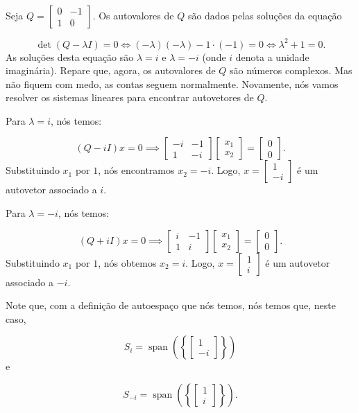 \begin{Example}
	Seja $Q = \begin{bmatrix}
		0 & -1 \\
		1 & 0
	\end{bmatrix}$. Os autovalores de $Q$ são dados pelas soluções da equação
	
	$$
	\det(Q - \lambda I) = 0 \iff (-\lambda)(-\lambda) - 1\cdot(-1) = 0 \iff \lambda^2 + 1 = 0.
	$$
	As soluções desta equação são $\lambda = i$ e $\lambda = -i$ (onde $i$ denota a unidade imaginária). Repare que, agora, os autovalores de $Q$ são números complexos. Mas não fiquem com medo, as contas seguem normalmente. Novamente, nós vamos resolver os sistemas lineares para encontrar autovetores de $Q$.
	
	Para $\lambda = i$, nós temos:
	
	$$
	(Q - iI)x = 0 \implies \begin{bmatrix}
		-i & -1 \\
		1 & -i
	\end{bmatrix}\begin{bmatrix}
		x_1 \\
		x_2
	\end{bmatrix} = \begin{bmatrix}
		0 \\
		0
	\end{bmatrix}.
	$$
	Substituindo $x_1$ por $1$, nós encontramos $x_2 = -i$. Logo, $x = \begin{bmatrix}
		1 \\
		-i
	\end{bmatrix}$ é um autovetor associado a $i$.
	
	Para $\lambda = -i$, nós temos:
	
	$$
	(Q + iI)x = 0 \implies \begin{bmatrix}
		i & -1 \\
		1 & i
	\end{bmatrix}\begin{bmatrix}
		x_1 \\
		x_2
	\end{bmatrix} = \begin{bmatrix}
		0 \\
		0
	\end{bmatrix}.
	$$
	Substituindo $x_1$ por $1$, nós obtemos $x_2 = i$. Logo, $x = \begin{bmatrix}
		1 \\
		i
	\end{bmatrix}$ é um autovetor associado a $-i$.
	
	Note que, com a definição de autoespaço que nós temos, nós temos que, neste caso, 
	
	$$
	S_i = \operatorname{span}\left(\left\{\begin{bmatrix}
		1 \\
		-i
	\end{bmatrix}\right\}\right)
	$$
	e
	
	$$
	S_{-i} = \operatorname{span}\left(\left\{\begin{bmatrix}
		1 \\
		i
	\end{bmatrix}\right\}\right).
	$$
\end{Example}

